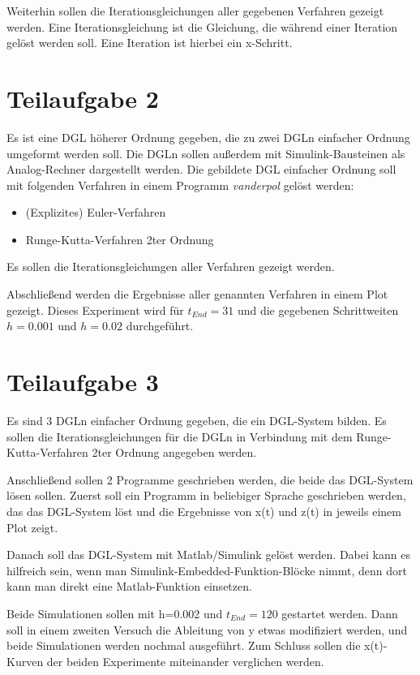 \documentclass[]{scrartcl}
\begin{document}
Weiterhin sollen die Iterationsgleichungen aller gegebenen Verfahren gezeigt werden. Eine Iterationsgleichung ist die Gleichung, die während einer Iteration gelöst werden soll. Eine Iteration ist hierbei ein x-Schritt.

\section{Teilaufgabe 2}
Es ist eine DGL höherer Ordnung gegeben, die zu zwei DGLn einfacher Ordnung umgeformt werden soll. Die DGLn sollen außerdem mit Simulink-Bausteinen als Analog-Rechner dargestellt werden. Die gebildete DGL einfacher Ordnung soll mit folgenden Verfahren in einem Programm \textit{vanderpol} gelöst werden:

\begin{itemize}
	\item (Explizites) Euler-Verfahren
	\item Runge-Kutta-Verfahren 2ter Ordnung
\end{itemize}

Es sollen die Iterationsgleichungen aller Verfahren gezeigt werden.

Abschließend werden die Ergebnisse aller genannten Verfahren in einem Plot gezeigt. Dieses Experiment wird für $t_{End} = 31$ und die gegebenen Schrittweiten $h=0.001$ und $h=0.02$ durchgeführt.

\section{Teilaufgabe 3}
Es sind 3 DGLn einfacher Ordnung gegeben, die ein DGL-System bilden. Es sollen die Iterationsgleichungen für die DGLn in Verbindung mit dem Runge-Kutta-Verfahren 2ter Ordnung angegeben werden.

Anschließend sollen 2 Programme geschrieben werden, die beide das DGL-System lösen sollen. Zuerst soll ein Programm in beliebiger Sprache geschrieben werden, das das DGL-System löst und die Ergebnisse von x(t) und z(t) in jeweils einem Plot zeigt.

Danach soll das DGL-System mit Matlab/Simulink gelöst werden. Dabei kann es hilfreich sein, wenn man Simulink-Embedded-Funktion-Blöcke nimmt, denn dort kann man direkt eine Matlab-Funktion einsetzen.

Beide Simulationen sollen mit h=0.002 und $t_{End}=120$ gestartet werden. Dann soll in einem zweiten Versuch die Ableitung von y etwas modifiziert werden, und beide Simulationen werden nochmal ausgeführt. Zum Schluss sollen die x(t)-Kurven der beiden Experimente miteinander verglichen werden.
\end{document}
